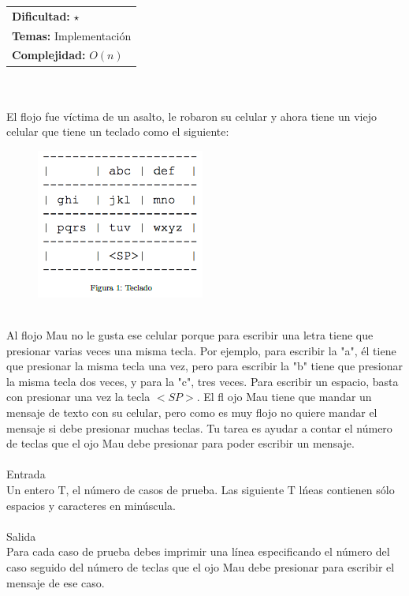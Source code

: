\documentclass[12pt]{article}
\begin{document}
\hfill
\begin{tabular}{@{}l@{}}
\textbf{Dificultad:} $\star$\\
\textbf{Temas:} Implementación\\
\textbf{Complejidad:} $O(n)$
\end{tabular}\\
\\El flojo fue v\'ictima de un asalto, le robaron su celular y ahora tiene un viejo celular que tiene un teclado como
el siguiente:
\begin{figure}[h!] 
\begin{center} 
\includegraphics[scale = 1.0]{i2.PNG}\hspace{50mm}  
\end{center} 
\end{figure}
\\Al 
flojo Mau no le gusta ese celular porque para escribir una letra tiene que presionar varias veces una misma
tecla. Por ejemplo, para escribir la "a", \'el tiene que presionar la misma tecla una vez, pero para escribir la "b" tiene
que presionar la misma tecla dos veces, y para la "c", tres veces. Para escribir un espacio, basta con presionar una
vez la tecla $<SP>$.
El fl
ojo Mau tiene que mandar un mensaje de texto con su celular, pero como es muy 
flojo no quiere mandar
el mensaje si debe presionar muchas teclas. Tu tarea es ayudar a contar el n\'umero de teclas que el 
ojo Mau debe
presionar para poder escribir un mensaje.\\
\\
\textrm{\large Entrada}
\\Un entero $\mathrm{T}$, el n\'umero de casos de prueba. Las siguiente $\mathrm{T}$ l\'neas contienen s\'olo espacios y caracteres en
min\'uscula.\\
\\
\textrm{\large Salida}
\\Para cada caso de prueba debes imprimir una l\'inea especificando el n\'umero del caso seguido del n\'umero de
teclas que el 
ojo Mau debe presionar para escribir el mensaje de ese caso.\\
\end{document}
